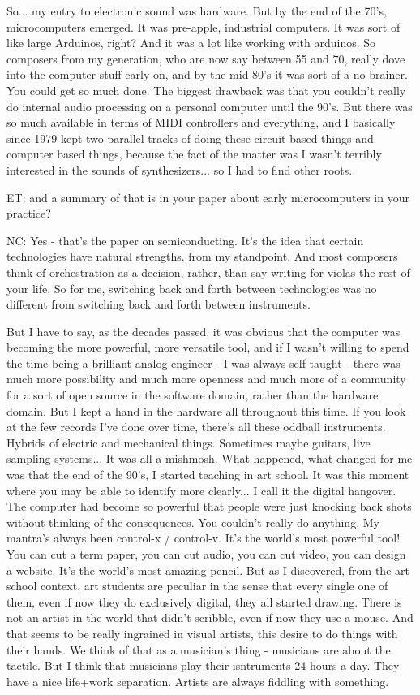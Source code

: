 So... my entry to electronic sound was hardware. But by the end of the 70's, microcomputers emerged. It was pre-apple, industrial computers. It was sort of like large Arduinos, right? And it was a lot like working with arduinos. So composers from my generation, who are now say between 55 and 70, really dove into the computer stuff early on, and by the mid 80's it was sort of a no brainer. You could get so much done. The biggest drawback was that you couldn't really do internal audio processing on a personal computer until the 90's. But there was so much available in terms of MIDI controllers and everything, and I basically since 1979 kept two parallel tracks of doing these circuit based things and computer based things, because the fact of the matter was I wasn't terribly interested in the sounds of synthesizers... so I had to find other roots. 

ET: and a summary of that is in your paper about early microcomputers in your practice? 

NC: Yes - that's the paper on semiconducting. It's the idea that certain technologies have natural strengths. from my standpoint. And most composers think of orchestration as a decision, rather, than say writing for violas the rest of your life. So for me, switching back and forth between technologies was no different from switching back and forth between instruments. 

But I have to say, as the decades passed, it was obvious that the computer was becoming the more powerful, more versatile tool, and if I wasn't willing to spend the time being a brilliant analog engineer - I was always self taught - there was much more possibility and much more openness and much more of a community for a sort of open source in the software domain, rather than the hardware domain. But I kept a hand in the hardware all throughout this time. If you look at the few records I've done over time, there's all these oddball instruments. Hybrids of electric and mechanical things. Sometimes maybe guitars, live sampling systems... It was all a mishmosh. What happened, what changed for me was that the end of the 90's, I started teaching in art school. It was this moment where you may be able to identify more clearly... I call it the digital hangover. The computer had become so powerful that people were just knocking back shots without thinking of the consequences. You couldn't really do anything. My mantra's always been control-x / control-v. It's the world's most powerful tool! You can cut a term paper, you can cut audio, you can cut video, you can design a website. It's the world's most amazing pencil. But as I discovered, from the art school context, art students are peculiar in the sense that every single one of them, even if now they do exclusively digital, they all started drawing. There is not an artist in the world that didn't scribble, even if now they use a mouse. And that seems to be really ingrained in visual artists, this desire to do things with their hands. We think of that as a musician's thing - musicians are about the tactile. But I think that musicians play their isntruments 24 hours a day. They have a nice life+work separation. Artists are always fiddling with something. 

